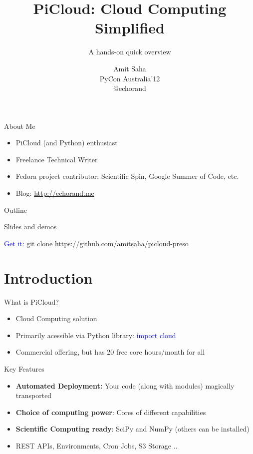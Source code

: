 \documentclass{beamer} \usepackage{fancyvrb} \usepackage{listings}
\title{PiCloud: Cloud Computing Simplified}
\subtitle{A hands-on quick overview}
\author{Amit Saha \\ PyCon Australia'12 \\ @echorand \\ }
\begin{document}
    \begin{frame}
      \titlepage
    \end{frame}

    \begin{frame}{About Me}
      \begin{itemize}
      \item PiCloud (and Python) enthusiast
      \item Freelance Technical Writer
      \item Fedora project contributor: Scientific Spin, Google Summer
        of Code, etc.
      \item Blog: \url{http://echorand.me}
      \end{itemize}
    \end{frame}

    \begin{frame}{Outline}
      \tableofcontents
      \end{frame}

    \begin{frame}{Slides and demos}
      \begin{center}
        \textcolor{blue}{Get it:} git clone https://github.com/amitsaha/picloud-preso
      \end{center}
    \end{frame}


    \section{Introduction}

    \begin{frame}{What is PiCloud?}
      \begin{itemize}
      \item Cloud Computing solution
      \item Primarily acessible via Python library:
        \textcolor{blue}{import cloud}
      \item Commercial offering, but has 20 free core hours/month for
        all
      \end{itemize}
    \end{frame}

    \begin{frame}{Key Features}
      \begin{itemize}
      \item \textbf{Automated Deployment:} Your code (along with
        modules) magically transported \pause
      \item \textbf{Choice of computing power}: Cores of different
        capabilities
      \item \textbf{Scientific Computing ready}: SciPy and NumPy
        (others can be installed)
      \item REST APIs, Environments, Cron Jobs, S3 Storage ..
      \end{itemize}
    \end{frame}
\end{document}
